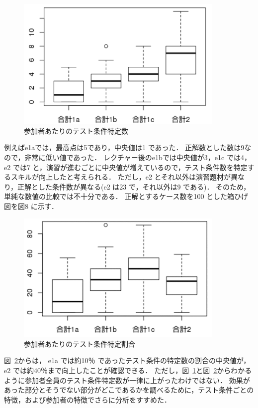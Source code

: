 \begin{figure}[htbp]
  \begin{center}
  \includegraphics[width=10cm]{./image/D-3-Fig10.png}
  \caption{参加者あたりのテスト条件特定数}
  \label{fig:D-3-Fig10}
  \end{center}
\end{figure}

例えばe1aでは，最高点は5であり，中央値は1 であった．
正解数とした数は9なので，非常に低い値であった．
レクチャー後のe1bでは中央値が3，e1c では4，e2 では7 と，演習が進むごとに中央値が増えているので，テスト条件数を特定するスキルが向上したと考えられる．
ただし，e2 とそれ以外は演習題材が異なり，正解とした条件数が異なる(e2 は23 で，それ以外は9 である)．
そのため，単純な数値の比較では不十分である．
正解とするケース数を100 とした箱ひげ図を図8 に示す．
\begin{figure}[htbp]
  \begin{center}
  \includegraphics[width=10cm]{./image/D-3-Fig11.png}
  \caption{参加者あたりのテスト条件特定割合}
  \label{fig:D-3-Fig11}
  \end{center}
   \end{figure}

図~\ref{fig:D-3-Fig11}からは， e1a では約10％ であったテスト条件の特定数の割合の中央値が，e2 では約40％まで向上したことが確認できる．
ただし，図~\ref{fig:D-3-Fig10}と図~\ref{fig:D-3-Fig11}からわかるように参加者全員のテスト条件特定数が一律に上がったわけではない．
効果があった部分とそうでない部分がどこであるかを調べるために，テスト条件ごとの特徴，および参加者の特徴でさらに分析をすすめた．

